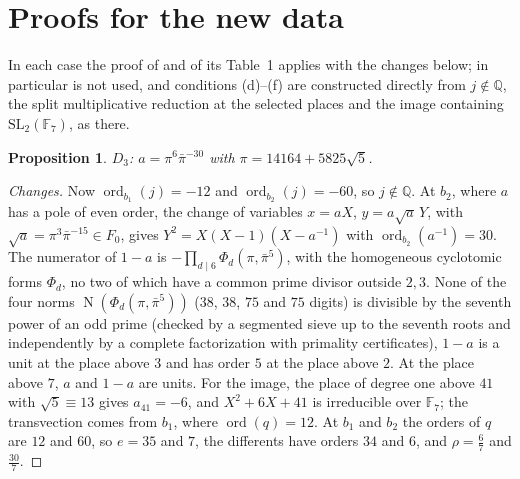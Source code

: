 \documentclass[11pt]{amsart}
\newtheorem{proposition}[theorem]{Proposition}
\theoremstyle{remark}
\newcommand{\Q}{\mathbb Q}
\newcommand{\F}{\mathbb F}
\newcommand{\Nm}{\operatorname{N}}
\begin{document}
\appendix

\section{Proofs for the new data}\label{s:proofs}

In each case the proof of \cite[Prop.~2]{Note} and of its Table~1 applies with the changes below; in particular
\cite[Cor.~2.2]{IUT4} is not used, and conditions (d)--(f) are constructed directly from $j\notin\Q$, the split
multiplicative reduction at the selected places and the image containing $\mathrm{SL}_2(\F_7)$, as there.

\begin{proposition}\label{p:D3}
$D_3$: $a=\pi^6\bar\pi^{-30}$ with $\pi=14164+5825\sqrt5$.
\end{proposition}
\begin{proof}[Changes]
Now $\operatorname{ord}_{b_1}(j)=-12$ and $\operatorname{ord}_{b_2}(j)=-60$, so $j\notin\Q$. At $b_2$, where $a$ has a
pole of even order, the change of variables $x=aX$, $y=a\sqrt a\,Y$, with $\sqrt a=\pi^3\bar\pi^{-15}\in F_0$, gives
$Y^2=X(X-1)(X-a^{-1})$ with $\operatorname{ord}_{b_2}(a^{-1})=30$. The numerator of $1-a$ is
$-\prod_{d\mid6}\Phi_d(\pi,\bar\pi^{5})$, with the homogeneous cyclotomic forms $\Phi_d$, no two of which have a common
prime divisor outside $2,3$. None of the four norms $\Nm(\Phi_d(\pi,\bar\pi^5))$ ($38$, $38$, $75$ and $75$ digits) is
divisible by the seventh power of an odd prime (checked by a segmented sieve up to the seventh roots and independently
by a complete factorization with primality certificates), $1-a$ is a unit at the place above $3$ and has order $5$ at
the place above $2$. At the place above $7$, $a$ and $1-a$ are units. For the image, the place of degree one above
$41$ with $\sqrt5\equiv13$ gives $a_{41}=-6$, and $X^2+6X+41$ is irreducible over $\F_7$; the transvection comes from
$b_1$, where $\operatorname{ord}(q)=12$. At $b_1$ and $b_2$ the orders of $q$ are $12$ and $60$, so
$e=35$ and $7$, the differents have orders $34$ and $6$, and $\rho=\tfrac67$ and $\tfrac{30}7$.
\end{proof}
\end{document}
